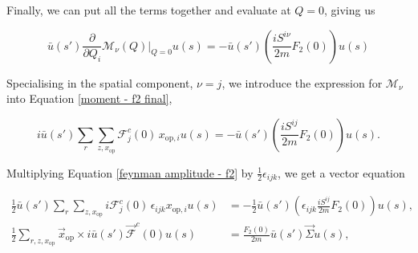 \documentclass{article}
\numberwithin{equation}{section} %
\begin{document}
%
%

Finally, we can put all the terms together and evaluate at $Q=0$, giving us

\begin{equation}
\bar{u}(s')\frac{\partial}{\partial Q_i} \mathcal{M}_\nu(Q)\bigg\vert_{Q=0}u(s) = -\bar{u}(s')\left( \frac{iS^{i\nu}}{2m}F_2(0)\right)u(s)
\label{moment - f2 final}
\end{equation}

Specialising in the spatial component, $\nu=j$, we introduce the expression for $\mathcal{M}_\nu$ into Equation \ref{moment - f2 final},

\begin{equation}
i\bar{u}(s')\sum_r\sum_{z,x_\mathrm{op}} \mathcal{F}^c_j(0) \, x_{\mathrm{op},i}u(s) = -\bar{u}(s')\left( \frac{iS^{ij}}{2m}F_2(0)\right)u(s).
\label{feynman amplitude - f2}
\end{equation}

Multiplying Equation \ref{feynman amplitude - f2} by $\frac{1}{2}\epsilon_{ijk}$, we get a vector equation

\begin{align}
\frac{1}{2} \bar{u}(s')\sum_r\sum_{z,x_\mathrm{op}} i\mathcal{F}^c_j(0) \, \epsilon_{ijk} x_{\mathrm{op},i}u(s) &= -\frac{1}{2}\bar{u}(s')\left( \epsilon_{ijk}\frac{iS^{ij}}{2m}F_2(0)\right)u(s),\nonumber\\
\frac{1}{2} \sum_{r,z,x_\mathrm{op}} \vec{x}_{\mathrm{op}} \times i\bar{u}(s')\vec{\mathcal{F}}^c(0)u(s)  &= \frac{F_2(0)}{2m}\bar{u}(s')\vec{\Sigma} u(s),
\label{feynman amplitude - f2 final}
\end{align}
\end{document}
